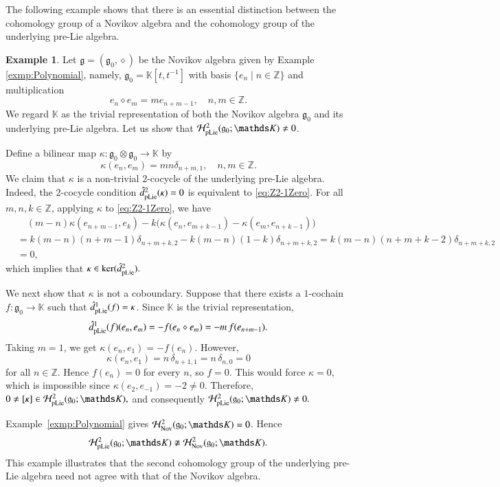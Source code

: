 \documentclass[12pt]{amsart}
\theoremstyle{definition}
\newtheorem{ex}[thm]{Example}
\newcommand{\g}{\mathfrak g}
\newcommand{\huaH}{\mathcal{H}}
\newcommand{\nov}{{\rm Nov}}
\newcommand{\pl}{{\rm pLie}}
\begin{document}
The following example shows that there is an essential distinction between the cohomology group of a Novikov algebra and the cohomology group of the underlying pre-Lie algebra.
\begin{ex}
Let $\g=(\g_0,\diamond)$ be the Novikov algebra given by Example \ref{exmp:Polynomial}, namely,
$
\g_0=\mathds K[t,t^{-1}]
$
with basis $\{e_n\mid n\in\mathds Z\}$ and multiplication
$$
e_n\diamond e_m=me_{n+m-1},
\quad n,m\in\mathds Z.
$$
We regard $\mathds K$ as the trivial representation of both the Novikov algebra $\g_0$ and its underlying pre-Lie algebra.  Let us show that $\huaH_{\pl}^2(\g_0;\mathds K)\neq0$.

Define a bilinear map
$
\kappa:\g_0\otimes\g_0\longrightarrow\mathds K
$
by
$$
\kappa(e_n,e_m)=mn\delta_{n+m,1},
\quad n,m\in\mathds Z.
$$
We claim that $\kappa$ is a non-trivial $2$-cocycle of the underlying pre-Lie algebra.
Indeed, the $2$-cocycle condition $\hat d_{\pl}^2(\kappa)=0$ is equivalent to \eqref{eq:Z2-1Zero}.
For all $m,n,k\in\mathds Z$, applying $\kappa$ to \eqref{eq:Z2-1Zero}, we have
\begin{align*}
&\quad(m-n)\kappa(e_{n+m-1},e_k)-k\bigl(\kappa(e_n,e_{m+k-1})-\kappa(e_m,e_{n+k-1})\bigr)\\
&=k(m-n)(n+m-1)\delta_{n+m+k,2}-k(m-n)(1-k)\delta_{n+m+k,2}=k(m-n)(n+m+k-2)\delta_{n+m+k,2}\\
&=0,
\end{align*}
which implies that $\kappa\in \ker(\hat d_{\pl}^2).$

We next show that $\kappa$ is not a coboundary. Suppose that there exists a $1$-cochain
$
f:\g_0 \longrightarrow \mathds K
$
such that $\hat d_{\pl}^1(f)=\kappa$. Since $\mathds K$ is the trivial representation,
$$
\hat d_{\pl}^1(f)(e_n,e_m)=-f(e_n\diamond e_m)=-m\,f(e_{n+m-1}).
$$
Taking $m=1$, we get
$
\kappa(e_n,e_1)=-f(e_n).
$
However,
$$
\kappa(e_n,e_1)=n\,\delta_{n+1,1}=n\,\delta_{n,0}=0
$$
for all $n\in\mathds Z$. Hence $f(e_n)=0$ for every $n$, so $f=0$. This would force $\kappa=0$, which is impossible since $\kappa(e_2,e_{-1})=-2\neq 0.$
Therefore,
$
0\neq[\kappa] \in \huaH_{\pl}^2(\g_0;\mathds K),
$
and consequently
$
\huaH_{\pl}^2(\g_0;\mathds K)\neq 0.
$

Example~\ref{exmp:Polynomial} gives $\huaH_{\nov}^2(\g_0;\mathds K)=0$. Hence
\[
	\huaH_{\pl}^2(\g_0;\mathds K)
	\not\cong
	\huaH_{\nov}^2(\g_0;\mathds K).
\]
This example illustrates that the second cohomology group of the underlying pre-Lie algebra need not agree with that of the Novikov algebra.



\end{ex}
 
\end{document}
